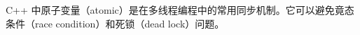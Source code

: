 
\begin{issues}
\issueDraft
\issueTODO
\end{issues}

C++ 中原子变量（atomic）是在多线程编程中的常用同步机制。它可以避免竟态条件（race condition）和死锁（dead lock）问题。